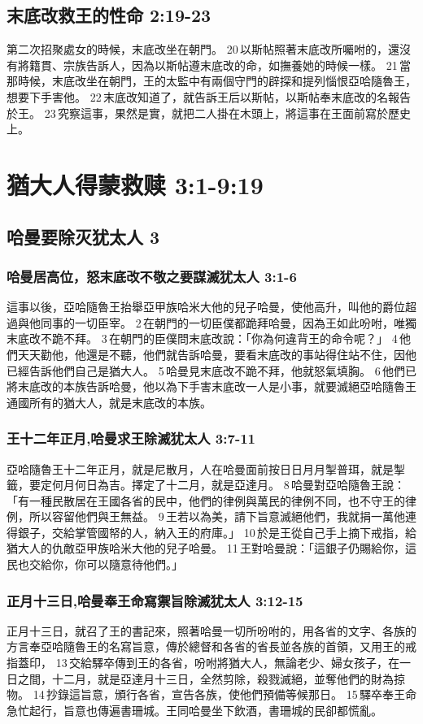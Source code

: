 \subsection{末底改救王的性命 2:19-23}
第二次招聚處女的時候，末底改坐在朝門。 20 以斯帖照著末底改所囑咐的，還沒有將籍貫、宗族告訴人，因為以斯帖遵末底改的命，如撫養她的時候一樣。 21 當那時候，末底改坐在朝門，王的太監中有兩個守門的辟探和提列惱恨亞哈隨魯王，想要下手害他。 22 末底改知道了，就告訴王后以斯帖，以斯帖奉末底改的名報告於王。 23 究察這事，果然是實，就把二人掛在木頭上，將這事在王面前寫於歷史上。

\section{猶大人得蒙救赎 3:1-9:19}
\subsection{哈曼要除灭犹太人 3}
\subsubsection{哈曼居高位，怒末底改不敬之要謀滅犹太人 3:1-6}
這事以後，亞哈隨魯王抬舉亞甲族哈米大他的兒子哈曼，使他高升，叫他的爵位超過與他同事的一切臣宰。 2 在朝門的一切臣僕都跪拜哈曼，因為王如此吩咐，唯獨末底改不跪不拜。 3 在朝門的臣僕問末底改說：「你為何違背王的命令呢？」 4 他們天天勸他，他還是不聽，他們就告訴哈曼，要看末底改的事站得住站不住，因他已經告訴他們自己是猶大人。 5 哈曼見末底改不跪不拜，他就怒氣填胸。 6 他們已將末底改的本族告訴哈曼，他以為下手害末底改一人是小事，就要滅絕亞哈隨魯王通國所有的猶大人，就是末底改的本族。


\subsubsection{王十二年正月,哈曼求王除滅犹太人 3:7-11}
亞哈隨魯王十二年正月，就是尼散月，人在哈曼面前按日日月月掣普珥，就是掣籤，要定何月何日為吉。擇定了十二月，就是亞達月。 8 哈曼對亞哈隨魯王說：「有一種民散居在王國各省的民中，他們的律例與萬民的律例不同，也不守王的律例，所以容留他們與王無益。 9 王若以為美，請下旨意滅絕他們，我就捐一萬他連得銀子，交給掌管國帑的人，納入王的府庫。」 10 於是王從自己手上摘下戒指，給猶大人的仇敵亞甲族哈米大他的兒子哈曼。 11 王對哈曼說：「這銀子仍賜給你，這民也交給你，你可以隨意待他們。」

\subsubsection{正月十三日,哈曼奉王命寫禦旨除滅犹太人 3:12-15}
正月十三日，就召了王的書記來，照著哈曼一切所吩咐的，用各省的文字、各族的方言奉亞哈隨魯王的名寫旨意，傳於總督和各省的省長並各族的首領，又用王的戒指蓋印， 13 交給驛卒傳到王的各省，吩咐將猶大人，無論老少、婦女孩子，在一日之間，十二月，就是亞達月十三日，全然剪除，殺戮滅絕，並奪他們的財為掠物。 14 抄錄這旨意，頒行各省，宣告各族，使他們預備等候那日。 15 驛卒奉王命急忙起行，旨意也傳遍書珊城。王同哈曼坐下飲酒，書珊城的民卻都慌亂。


